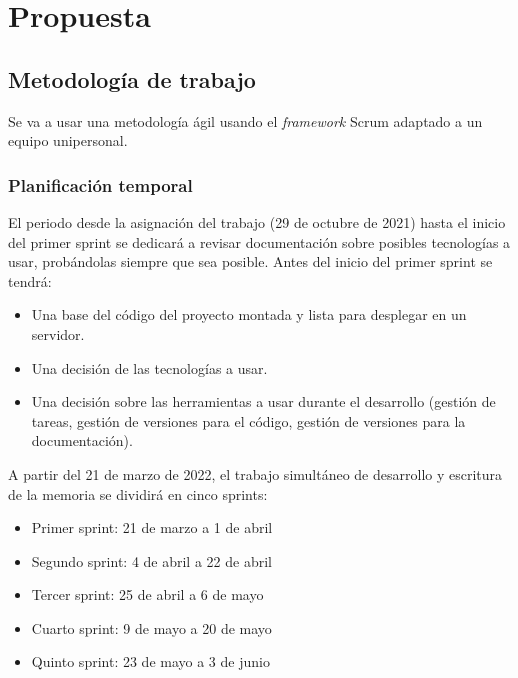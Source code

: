 \chapter{Propuesta}


\section{Metodología de trabajo}

Se va a usar una metodología ágil usando el \textit{framework} Scrum adaptado a un equipo unipersonal.


\subsection{Planificación temporal}

El periodo desde la asignación del trabajo (29 de octubre de 2021) hasta el inicio del primer sprint se dedicará a revisar documentación sobre posibles tecnologías a usar, probándolas siempre que sea posible. Antes del inicio del primer sprint se tendrá:

\begin{itemize}
    \item Una base del código del proyecto montada y lista para desplegar en un servidor.
    \item Una decisión de las tecnologías a usar.
    \item Una decisión sobre las herramientas a usar durante el desarrollo (gestión de tareas, gestión de versiones para el código, gestión de versiones para la documentación).
\end{itemize}

A partir del 21 de marzo de 2022, el trabajo simultáneo de desarrollo y escritura de la memoria se dividirá en cinco sprints:
\begin{itemize}
    \item Primer sprint: 21 de marzo a 1 de abril
    \item Segundo sprint: 4 de abril a 22 de abril
    \item Tercer sprint: 25 de abril a 6 de mayo
    \item Cuarto sprint: 9 de mayo a 20 de mayo
    \item Quinto sprint: 23 de mayo a 3 de junio
\end{itemize}

